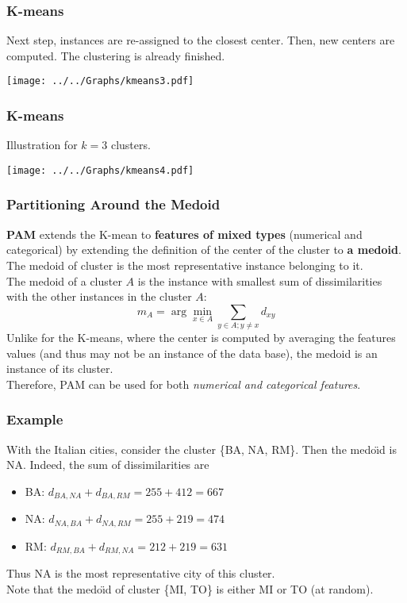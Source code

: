 \begin{frame}
\frametitle{K-means}
Next step, instances are re-assigned to the closest center. Then, new centers are computed. The clustering is already finished.
\begin{center}
\texttt{[image: ../../Graphs/kmeans3.pdf]}
\end{center}
\end{frame}
\begin{frame}
\frametitle{K-means}
Illustration for $k=3$ clusters.
\begin{center}
\texttt{[image: ../../Graphs/kmeans4.pdf]}
\end{center}
\end{frame}
\begin{frame}
\frametitle{Partitioning Around the Medoid}
{\bf PAM} extends the K-mean to {\bf features of mixed types} (numerical and categorical) by extending the definition of the center of the cluster to {\bf a medoid}.\\
\vspace{0.3cm} 
The medoid of cluster is the most representative instance belonging to it.\\
\vspace{0.3cm}
The medoid of a cluster $A$ is the instance with smallest sum of dissimilarities with the other instances in the cluster $A$:
$$
m_A = \arg \min_{x \in A} \sum_{y\in A; y\neq x} d_{xy}
$$
Unlike for the K-means, where the center is computed by averaging the features values (and thus may not be an instance of the data base), the medoid is an instance of its cluster.\\ 
\vspace{0.3cm}
Therefore, PAM can be used for both {\it numerical and categorical features}.
\end{frame}
\begin{frame}
\frametitle{Example}
With the Italian cities, consider the cluster \{BA, NA, RM\}. Then the medo{\"\i}d is NA. Indeed, the sum of dissimilarities are
\begin{itemize}
\item BA: $d_{BA,NA}+d_{BA,RM} = 255+412=667$
\item NA: $d_{NA,BA}+d_{NA,RM} = 255+219=474$
\item RM: $d_{RM,BA}+d_{RM,NA} = 212+219=631$
\end{itemize}
Thus NA is the most representative city of this cluster. \\
\vspace{0.3cm}
Note that the medo{\"\i}d of cluster \{MI, TO\} is either MI or TO (at random). 
\end{frame}
